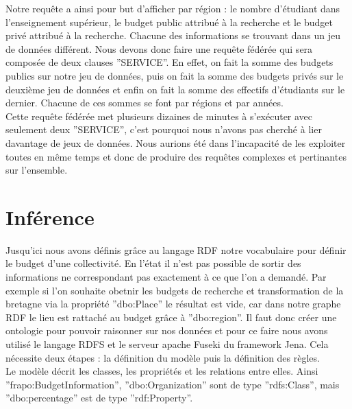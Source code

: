\documentclass[a4paper,sffamily,12pt]{article}
\begin{document}
			\vspace{0.5cm}
			
			Notre requête a ainsi pour but d'afficher par région : le nombre d'étudiant dans l'enseignement supérieur, le budget public attribué à la recherche et le budget privé attribué à la recherche. Chacune des informations se trouvant dans un jeu de données différent. Nous devons donc faire une requête fédérée qui sera composée de deux clauses ''SERVICE''. En effet, on fait la somme des budgets publics sur notre jeu de données, puis on fait la somme des budgets privés sur le deuxième jeu de données et enfin on fait la somme des effectifs d'étudiants sur le dernier. Chacune de ces sommes se font par régions et par années. \\
			
			\indent Cette requête fédérée met plusieurs dizaines de minutes à s'exécuter avec seulement deux ''SERVICE'', c'est pourquoi nous n'avons pas cherché à lier davantage de jeux de données. Nous aurions été dans l'incapacité de les exploiter toutes en même temps et donc de produire des requêtes complexes et pertinantes sur l'ensemble.

			\vspace{0.5cm}			

	\section{Inférence}

		\vspace{0.5cm}
		
		Jusqu'ici nous avons définis grâce au langage RDF notre vocabulaire pour définir le budget d'une collectivité. En l'état il n'est pas possible de sortir des informations ne correspondant pas exactement à ce que l'on a demandé. Par exemple si l'on souhaite obetnir les budgets de recherche et transformation de la bretagne via la propriété ''dbo:Place'' le résultat est vide, car dans notre graphe RDF le lieu est rattaché au budget grâce à ''dbo:region''. Il faut donc créer une ontologie pour pouvoir raisonner sur nos données et pour ce faire nous avons utilisé le langage RDFS et le serveur apache Fuseki du framework Jena. Cela nécessite deux étapes : la définition du modèle puis la définition des règles.\\
		
		\indent Le modèle décrit les classes, les propriétés et les relations entre elles. Ainsi ''frapo:BudgetInformation'', ''dbo:Organization'' sont de type ''rdfs:Class'', mais ''dbo:percentage'' est de type ''rdf:Property''. \\ 
		
\end{document}
